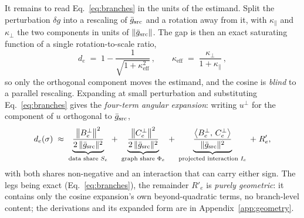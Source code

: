 It remains to read Eq.~\ref{eq:branches} in the units of the estimand.
Split the perturbation $\delta g$ into a rescaling of $\bar g_{\mathrm{src}}$
and a rotation away from it, with $\kappa_\parallel$ and
$\kappa_\perp$ the two components in units of $\|\bar g_{\mathrm{src}}\|$.
The gap is then an exact saturating function of a single
rotation-to-scale ratio,
\begin{equation}
d_e \;=\; 1 - \frac{1}{\sqrt{1 + \kappa_{\mathrm{eff}}^2}}\,,
\qquad
\kappa_{\mathrm{eff}} \;=\; \frac{\kappa_\perp}{1 + \kappa_\parallel}\,,
\label{eq:exact}
\end{equation}
so only the orthogonal component moves the estimand, and the cosine
is \emph{blind} to a parallel rescaling. Expanding at small perturbation
and substituting Eq.~\ref{eq:branches} gives the \emph{four-term
angular expansion}: writing $u^{\perp}$ for the component of $u$
orthogonal to $\bar g_{\mathrm{src}}$,
\begin{equation}
d_e(\sigma) \;\approx\;
\underbrace{\frac{\big\|B_e^{\perp}\big\|^2}{2\,\|\bar g_{\mathrm{src}}\|^2}}_{\text{data share }S_e}
\;+\;
\underbrace{\frac{\big\|C_e^{\perp}\big\|^2}{2\,\|\bar g_{\mathrm{src}}\|^2}}_{\text{graph share }\Phi_e}
\;+\;
\underbrace{\frac{\big\langle B_e^{\perp},\, C_e^{\perp}\big\rangle}{\|\bar g_{\mathrm{src}}\|^2}}_{\text{projected interaction }I_e}
\;+\; R'_e,
\label{eq:fourterm}
\end{equation}
with both shares non-negative and an interaction that can carry
either sign. The legs being exact
(Eq.~\ref{eq:branches}), the remainder $R'_e$ is \emph{purely
geometric}: it contains only the cosine expansion's own
beyond-quadratic terms, no branch-level content; the derivations and
its expanded form are in Appendix~\ref{app:geometry}.

